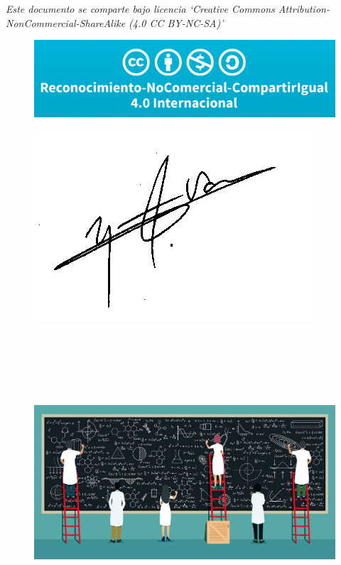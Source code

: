 \emph{\normalsize{Este} documento se comparte bajo licencia `Creative Commons Attribution-NonCommercial-ShareAlike (4.0 CC BY-NC-SA)'}


\begin{multicols}{2}
\begin{figure}[H]
	\centering
	\includegraphics[width=.5
	\textwidth]{imagenes/licencia.png}
	
\end{figure}
\begin{figure}[H]
	\centering
	\includegraphics[width=.25
	\textwidth]{imagenes/firma.png}
\end{figure}
\end{multicols}

\newpage




\newpage

$\,$

\newpage

$\,$

\vspace{1cm} 

$\,$

\begin{figure}[H]
	\centering
	\includegraphics[width=.80\textwidth]{imagenes/presenta1.png}
\end{figure}


